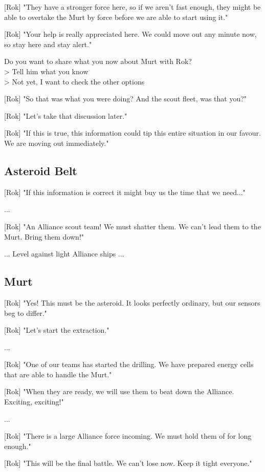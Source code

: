\documentclass[a4paper,12pt]{article}
\begin{document}
[Rok] "They have a stronger force here, so if we aren't fast enough, they might be able to overtake the Murt by force
before we are able to start using it."

[Rok] "Your help is really appreciated here. We could move out any minute now, so stay here and stay alert."

Do you want to share what you now about Murt with Rok?\\
> Tell him what you know\\
> Not yet, I want to check the other options

[Rok] "So that was what you were doing? And the scout fleet, was that you?"

[Rok] "Let's take that discussion later." 

[Rok] "If this is true, this information could tip this entire situation in our favour. We are moving out immediately."

\subsection{Asteroid Belt}

[Rok] "If this information is correct it might buy us the time that we need..."

...

[Rok] "An Alliance scout team! We must shatter them. We can't lead them to the Murt. Bring them down!"

... Level against light Alliance ships ...

\subsection{Murt}

[Rok] "Yes! This must be the asteroid. It looks perfectly ordinary, but our sensors beg to differ."

[Rok] "Let's start the extraction."

...

[Rok] "One of our teams has started the drilling. We have prepared energy cells that are able to handle the Murt."

[Rok] "When they are ready, we will use them to beat down the Alliance. Exciting, exciting!"

...

[Rok] "There is a large Alliance force incoming. We must hold them of for long enough."

[Rok] "This will be the final battle. We can't lose now. Keep it tight everyone."
\end{document}
